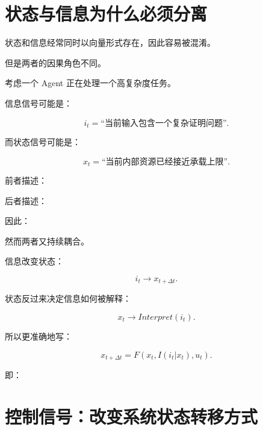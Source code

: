 \section{状态与信息为什么必须分离}

状态和信息经常同时以向量形式存在，因此容易被混淆。

但是两者的因果角色不同。

考虑一个 Agent 正在处理一个高复杂度任务。

信息信号可能是：

\[
i_t=
\text{“当前输入包含一个复杂证明问题”}.
\]

而状态信号可能是：

\[
x_t=
\text{“当前内部资源已经接近承载上限”}.
\]

前者描述：

\begin{statementbox}
\centering
{}
\end{statementbox}

后者描述：

\begin{statementbox}
\centering
{}
\end{statementbox}

因此：

\begin{statementbox}
\centering
{}
\end{statementbox}

然而两者又持续耦合。

信息改变状态：

\[
i_t
\rightarrow
x_{t+\Delta t}.
\]

状态反过来决定信息如何被解释：

\[
x_t
\rightarrow
Interpret(i_t).
\]

所以更准确地写：

\[
\boxed{
x_{t+\Delta t}
=
F(
x_t,
I(i_t|x_t),
u_t
).
}
\]

即：

\begin{statementbox}
\centering
{}
\end{statementbox}

\section{控制信号：改变系统状态转移方式}

